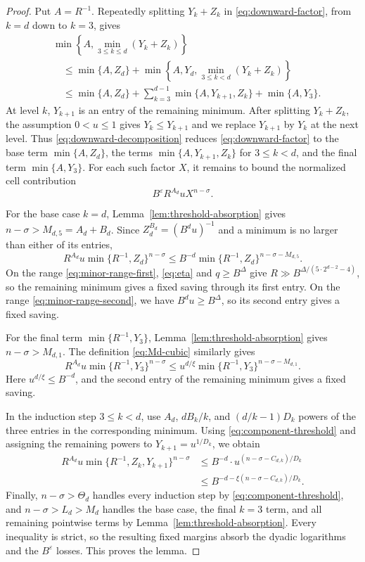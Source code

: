 \documentclass[reqno,a4paper,11pt]{amsart}
\numberwithin{equation}{section}
\newcommand{\eps}{\varepsilon}
\theoremstyle{plain}
\theoremstyle{definition}
\begin{document}
\begin{proof}
Put \(A=R^{-1}\).
Repeatedly splitting \(Y_k+Z_k\) in \eqref{eq:downward-factor}, from \(k=d\) down to \(k=3\), gives
\begin{equation}\label{eq:downward-decomposition}
 \begin{aligned}
 &\min\left\{A,\min_{3\leq k\leq d}(Y_k+Z_k)\right\}\\
 &\quad\leq \min\{A,Z_d\}
 +\min\left\{A,Y_d,\min_{3\leq k<d}(Y_k+Z_k)\right\}\\
 &\quad\leq \min\{A,Z_d\}
 +\sum_{k=3}^{d-1}\min\{A,Y_{k+1},Z_k\}
 +\min\{A,Y_3\}.
 \end{aligned}
\end{equation}
At level \(k\), \(Y_{k+1}\) is an entry of the remaining minimum.
After splitting \(Y_k+Z_k\), the assumption \(0<u\leq1\) gives \(Y_k\leq Y_{k+1}\) and we replace \(Y_{k+1}\) by \(Y_k\) at the next level.
Thus \eqref{eq:downward-decomposition} reduces \eqref{eq:downward-factor} to the base term \(\min\{A,Z_d\}\), the terms \(\min\{A,Y_{k+1},Z_k\}\) for \(3\leq k<d\), and the final term \(\min\{A,Y_3\}\).
For each such factor \(X\), it remains to bound the normalized cell contribution
\[
 B^\eps R^{A_d}uX^{n-\sigma}.
\]

For the base case \(k=d\), Lemma~\ref{lem:threshold-absorption} gives \(n-\sigma>M_{d,5}=A_d+B_d\).
Since \(Z_d^{B_d}=(B^du)^{-1}\) and a minimum is no larger than either of its entries,
\[
 R^{A_d}u
 \min\{R^{-1},Z_d\}^{n-\sigma}
 \leq
 B^{-d}
 \min\{R^{-1},Z_d\}^{n-\sigma-M_{d,5}}.
\]
On the range \eqref{eq:minor-range-first}, \eqref{eq:eta} and \(q\geq B^\Delta\) give \(R\gg B^{\Delta/(5\cdot2^{d-2}-4)}\), so the remaining minimum gives a fixed saving through its first entry.
On the range \eqref{eq:minor-range-second}, we have \(B^du\geq B^\Delta\), so its second entry gives a fixed saving.

For the final term \(\min\{R^{-1},Y_3\}\), Lemma~\ref{lem:threshold-absorption} gives \(n-\sigma>M_{d,1}\).
The definition \eqref{eq:Md-cubic} similarly gives
\[
R^{A_d}u
 \min\{R^{-1},Y_3\}^{n-\sigma}\leq
 u^{d/\xi}
 \min\{R^{-1},Y_3\}^{n-\sigma-M_{d,1}}.
\]
Here \(u^{d/\xi}\leq B^{-d}\), and the second entry of the remaining minimum gives a fixed saving.

In the induction step \(3\leq k<d\), use \(A_d\), \(dB_k/k\), and \((d/k-1)D_k\) powers of the three entries in the corresponding minimum.
Using \eqref{eq:component-threshold} and assigning the remaining powers to \(Y_{k+1}=u^{1/D_k}\), we obtain
\[
 \begin{aligned}
 R^{A_d}u
 \min\{R^{-1},Z_k,Y_{k+1}\}^{n-\sigma}
 & \leq B^{-d} \cdot u^{(n-\sigma-C_{d,k})/D_k}\\
 &
 \leq B^{-d-\xi(n-\sigma-C_{d,k})/D_k}.
 \end{aligned}
\]
Finally, \(n-\sigma>\Theta_d\) handles every induction step by \eqref{eq:component-threshold}, and \(n-\sigma>L_d>M_d\) handles the base case, the final \(k=3\) term, and all remaining pointwise terms by Lemma~\ref{lem:threshold-absorption}.
Every inequality is strict, so the resulting fixed margins absorb the dyadic logarithms and the \(B^\eps\) losses.
This proves the lemma.
\end{proof}
\end{document}
